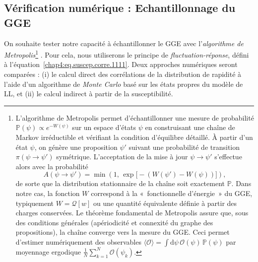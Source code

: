 \subsection{Vérification numérique : Echantillonnage du GGE}


On souhaite tester notre capacité à échantillonner le \gls{GGE} avec l’\emph{algorithme de Metropolis}\footnote{L’algorithme de Metropolis permet d’échantillonner une mesure de probabilité 
\(
\mathbb{P}(\psi) \propto e^{-W(\psi)}
\)
sur un espace d’états $\psi$ en construisant une chaîne de Markov irréductible et vérifiant la condition d’équilibre détaillé. À partir d’un état $\psi$, on génère une proposition $\psi'$ suivant une probabilité de transition \(\pi(\psi \to \psi')\) symétrique. L’acceptation de la mise à jour $\psi \to \psi'$ s’effectue alors avec la probabilité 
\[
A(\psi \to \psi') = 
\min\left(1,\,
\exp\bigl[-(W(\psi') - W(\psi))\bigr]\right),
\]
de sorte que la distribution stationnaire de la chaîne soit exactement $\mathbb{P}$. Dans notre cas, la fonction $W$ correspond à la «~fonctionnelle d’énergie~» du \gls{GGE}, typiquement $W = \mathcal{Q}[w]$ ou une quantité équivalente définie à partir des charges conservées. Le théorème fondamental de Metropolis assure que, sous des conditions générales (apériodicité et connexité du graphe des propositions), la chaîne converge vers la mesure du \gls{GGE}. Ceci permet d’estimer numériquement des observables 
\(
\langle \mathcal{O} \rangle = 
\int \mathrm{d}\psi\, \mathcal{O}(\psi)\,\mathbb{P}(\psi)
\)
par moyennage ergodique \(\frac{1}{N}\sum_{k=1}^N \mathcal{O}(\psi_k)\).}
.
Pour cela, nous utiliserons le principe de \emph{fluctuation-réponse}, défini à l’équation~\eqref{chap4:eq.suscep.corre.1111}.
Deux approches numériques seront comparées : (i) le calcul direct des corrélations de la distribution de rapidité à l’aide d’un algorithme de \emph{Monte Carlo} basé sur les états propres du modèle de \gls{LL}, et (ii) le calcul indirect à partir de la susceptibilité.

\medskip

